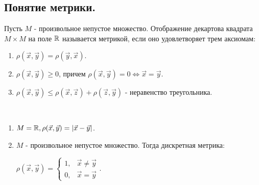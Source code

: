 \subsection{
    Понятие метрики.
}

\begin{definition}
    Пусть $M$ - произвольное непустое множество. Отображение декартова квадрата $M \times M$ на поле $\mathbb{R}$ называется метрикой, если оно удовлетворяет трем аксиомам:
    \begin{enumerate}
        \item $\rho(\vec{x}, \vec{y}) = \rho(\vec{y}, \vec{x})$.
        \item $\rho(\vec{x}, \vec{y}) \geq 0$, причем $\rho(\vec{x}, \vec{y}) = 0 \iff \vec{x} = \vec{y}$.
        \item $\rho(\vec{x}, \vec{y}) \leq \rho(\vec{x}, \vec{z}) + \rho(\vec{z}, \vec{y})$ - неравенство треугольника.
    \end{enumerate}
\end{definition}

\begin{example}~

    \begin{enumerate}
        \item $M = \mathbb{R}, \rho(\vec{x}, \vec{y}) = |\vec{x} - \vec{y}|$.
        \item $M$ - произвольное непустое множество. Тогда дискретная метрика: 
        
        $\rho(\vec{x}, \vec{y}) = 
        \begin{cases}
        1, & \vec{x} \ne \vec{y} \\
        0, & \vec{x} = \vec{y}
        \end{cases}$.
    \end{enumerate}
\end{example}
